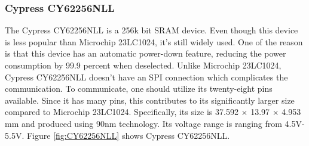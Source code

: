 %
%

\subsubsection{Cypress CY62256NLL}
The Cypress CY62256NLL is a 256k bit SRAM device. Even though this device is less popular than Microchip 23LC1024, it's still widely used. One of the reason is that this device has an automatic power-down feature, reducing the power consumption by 99.9 percent when deselected. Unlike Microchip 23LC1024, Cypress CY62256NLL doesn't have an SPI connection which complicates the communication. To communicate, one should utilize its twenty-eight pins available. Since it has many pins, this contributes to its significantly larger size compared to Microchip 23LC1024. Specifically, its size is 37.592 × 13.97 × 4.953 mm and produced using 90nm technology. Its voltage range is ranging from 4.5V-5.5V. Figure \ref{fig:CY62256NLL} shows Cypress CY62256NLL.

